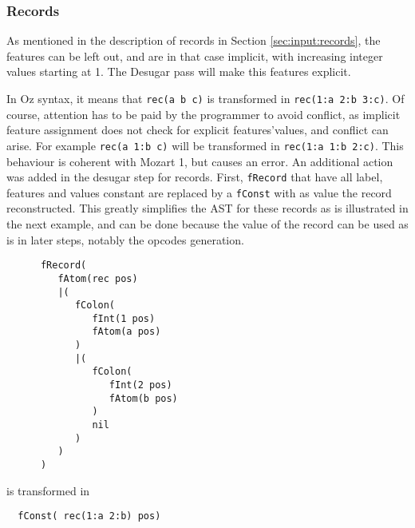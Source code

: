 \documentclass[a4paper]{memoir}
\begin{document}
\subsubsection{Records}\label{sec:arch:desugar:records}
As mentioned in the description of records in Section \ref{sec:input:records}, the features can be left out, and are in that case implicit, with increasing integer values starting at 1. The Desugar pass will make this features explicit.

In Oz syntax, it means that \lstinline!rec(a b c)! is transformed in \lstinline!rec(1:a 2:b 3:c)!. Of course, attention has to be paid by the programmer to avoid conflict, as implicit feature assignment does not check for explicit features'values, and conflict can arise. For example \lstinline!rec(a 1:b c)! will be transformed in \lstinline!rec(1:a 1:b 2:c)!. This behaviour is coherent with Mozart 1, but causes an error. %
An additional action was added in the desugar step for records. First, \lstinline!fRecord! that have all label, features and values constant are replaced by a \lstinline!fConst! with as value the record reconstructed. This greatly simplifies the AST for these records as is illustrated in the next example, and can be done because the value of the record can be used as is in later steps, notably the opcodes generation. 
\begin{lstlisting}
      fRecord(
         fAtom(rec pos)
         |(
            fColon(
               fInt(1 pos)
               fAtom(a pos)
            )
            |(
               fColon(
                  fInt(2 pos)
                  fAtom(b pos)
               )
               nil
            )
         )
      )
\end{lstlisting}
is transformed in
\begin{lstlisting}
  fConst( rec(1:a 2:b) pos)
\end{lstlisting}
\end{document}
